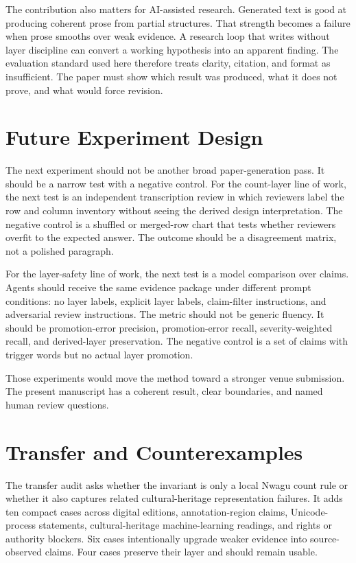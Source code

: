 \documentclass[sigconf,nonacm]{acmart}
\begin{document}
The contribution also matters for AI-assisted research. Generated text is good
at producing coherent prose from partial structures. That strength becomes a
failure when prose smooths over weak evidence. A research loop that writes
without layer discipline can convert a working hypothesis into an apparent
finding. The evaluation standard used here therefore treats clarity, citation, and
format as insufficient. The paper must show which result was produced, what it
does not prove, and what would force revision.

\section{Future Experiment Design}
The next experiment should not be another broad paper-generation pass. It should
be a narrow test with a negative control. For the count-layer line of work, the
next test is an independent transcription review in which reviewers label the
row and column inventory without seeing the derived design interpretation. The
negative control is a shuffled or merged-row chart that tests whether reviewers
overfit to the expected answer. The outcome should be a disagreement matrix,
not a polished paragraph.

For the layer-safety line of work, the next test is a model comparison over
claims. Agents should receive the same evidence package under different prompt
conditions: no layer labels, explicit layer labels, claim-filter instructions, and
adversarial review instructions. The metric should not be generic fluency. It
should be promotion-error precision, promotion-error recall, severity-weighted
recall, and derived-layer preservation. The negative control is a set of claims
with trigger words but no actual layer promotion.

Those experiments would move the method toward a stronger venue submission. The
present manuscript has a coherent result, clear boundaries, and named human
review questions.

\section{Transfer and Counterexamples}
The transfer audit asks whether the invariant is only a local Nwagu count rule
or whether it also captures related cultural-heritage representation failures.
It adds ten compact cases across digital editions, annotation-region claims,
Unicode-process statements, cultural-heritage machine-learning readings, and
rights or authority blockers. Six cases intentionally upgrade weaker evidence
into source-observed claims. Four cases preserve their layer and should remain
usable.
\end{document}
